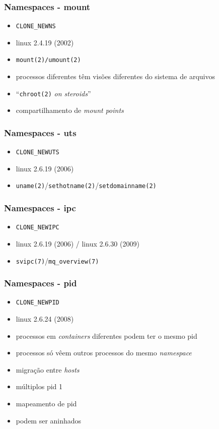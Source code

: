 \documentclass{beamer}
\begin{document}
\begin{frame}
    \frametitle{Namespaces - mount}
    \begin{itemize}
        \item \texttt{CLONE\_NEWNS}
        \item linux 2.4.19 (2002)
        \item \texttt{mount(2)/umount(2)}
        \item processos diferentes têm visões diferentes do sistema de arquivos
        \item ``\texttt{chroot(2)} \textit{on steroids}''
        \item compartilhamento de \textit{mount points}
    \end{itemize}
\end{frame}

\begin{frame}
    \frametitle{Namespaces - uts}
    \begin{itemize}
        \item \texttt{CLONE\_NEWUTS}
        \item linux 2.6.19 (2006)
        \item \texttt{uname(2)}/\texttt{sethotname(2)}/\texttt{setdomainname(2)}
    \end{itemize}
\end{frame}

\begin{frame}
    \frametitle{Namespaces - ipc}
    \begin{itemize}
        \item \texttt{CLONE\_NEWIPC}
        \item linux 2.6.19 (2006) / linux 2.6.30 (2009)
        \item \texttt{svipc(7)}/\texttt{mq\_overview(7)}
    \end{itemize}
\end{frame}

\begin{frame}
    \frametitle{Namespaces - pid}
    \begin{itemize}
        \item \texttt{CLONE\_NEWPID}
        \item linux 2.6.24 (2008)
        \item processos em \textit{containers} diferentes podem ter o mesmo pid
        \item processos só vêem outros processos do mesmo \textit{namespace}
        \item migração entre \textit{hosts}
        \item múltiplos pid 1
        \item mapeamento de pid
        \item podem ser aninhados
    \end{itemize}
\end{frame}
\end{document}
